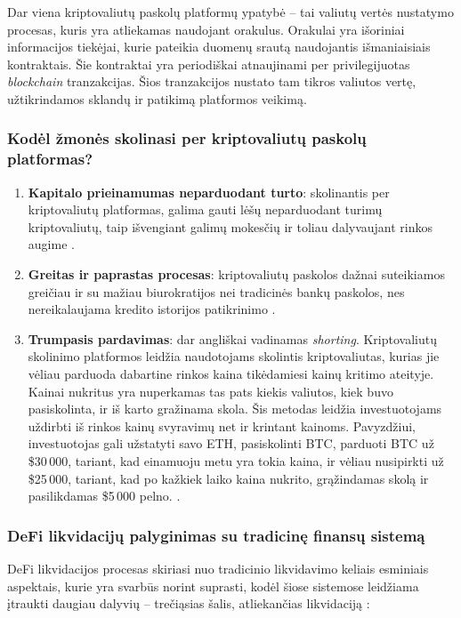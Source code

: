 \documentclass[]{VUMIFTemplateClass}
\begin{document}
Dar viena kriptovaliutų paskolų platformų ypatybė -- tai valiutų vertės nustatymo procesas, kuris yra atliekamas naudojant orakulus. Orakulai yra išoriniai informacijos tiekėjai, kurie pateikia duomenų srautą naudojantis išmaniaisiais kontraktais. Šie kontraktai yra periodiškai atnaujinami per privilegijuotas \textit{blockchain} tranzakcijas. Šios tranzakcijos nustato tam tikros valiutos vertę, užtikrindamos sklandų ir patikimą platformos veikimą.

\subsubsection{Kodėl žmonės skolinasi per kriptovaliutų paskolų platformas?}

\begin{enumerate}
    \item \textbf{Kapitalo prieinamumas neparduodant turto}: skolinantis per kriptovaliutų platformas, galima gauti lėšų neparduodant turimų kriptovaliutų, taip išvengiant galimų mokesčių ir toliau dalyvaujant rinkos augime \cite{kriptovaliutosio}.
    \item \textbf{Greitas ir paprastas procesas}: kriptovaliutų paskolos dažnai suteikiamos greičiau ir su mažiau biurokratijos nei tradicinės bankų paskolos, nes nereikalaujama kredito istorijos patikrinimo \cite{targettrend}.
    \item \textbf{Trumpasis pardavimas}: dar angliškai vadinamas \textit{shorting}. Kriptovaliutų skolinimo platformos leidžia naudotojams skolintis kriptovaliutas, kurias jie vėliau parduoda dabartine rinkos kaina tikėdamiesi kainų kritimo ateityje. Kainai nukritus yra nuperkamas tas pats kiekis valiutos, kiek buvo pasiskolinta, ir iš karto gražinama skola. Šis metodas leidžia investuotojams uždirbti iš rinkos kainų svyravimų net ir krintant kainoms. Pavyzdžiui, investuotojas gali užstatyti savo ETH, pasiskolinti BTC, parduoti BTC už \$30\,000, tariant, kad einamuoju metu yra tokia kaina, ir vėliau nusipirkti už \$25\,000, tariant, kad po kažkiek laiko kaina nukrito, grąžindamas skolą ir pasilikdamas \$5\,000 pelno.
    \cite{shortinimas}.
\end{enumerate}

\subsubsection{DeFi likvidacijų palyginimas su tradicinę finansų sistemą}
DeFi likvidacijos procesas skiriasi nuo tradicinio likvidavimo keliais esminiais aspektais, kurie yra svarbūs norint suprasti, kodėl šiose sistemose leidžiama įtraukti daugiau dalyvių – trečiąsias šalis, atliekančias likvidaciją \cite{whatisdefiliquidation}:
\end{document}
